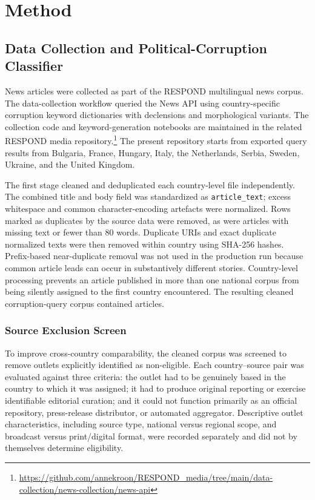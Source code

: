 \section{Method}



\subsection{Data Collection and Political-Corruption Classifier}
\label{sec:method-political-classifier}

News articles were collected as part of the RESPOND multilingual news corpus.
The data-collection workflow queried the News API using country-specific
corruption keyword dictionaries with declensions and morphological variants.
The collection code and keyword-generation notebooks are maintained in the
related RESPOND media repository.\footnote{\url{https://github.com/annekroon/RESPOND_media/tree/main/data-collection/news-collection/news-api}}
The present repository starts from \PCRawQueryN{} exported query results from
Bulgaria, France, Hungary, Italy, the Netherlands, Serbia, Sweden, Ukraine, and
the United Kingdom.

The first stage cleaned and deduplicated each country-level file independently. The combined
title and body field was standardized as \texttt{article\_text}; excess
whitespace and common character-encoding artefacts were normalized. Rows marked
as duplicates by the source data were removed, as were articles with missing
text or fewer than 80 words. Duplicate URIs and exact duplicate normalized texts were then
removed within country using SHA-256 hashes. Prefix-based near-duplicate removal
was not used in the production run because common article leads can occur in
substantively different stories. Country-level processing prevents an article
published in more than one national corpus from being silently assigned to the
first country encountered. The resulting cleaned corruption-query corpus
contained \PCCleanedQueryN{} articles.

\subsubsection{Source Exclusion Screen}

To improve cross-country comparability, the cleaned corpus was screened to
remove outlets explicitly identified as non-eligible. Each country--source pair was evaluated
against three criteria: the outlet had to be genuinely based in the country to
which it was assigned; it had to produce original reporting or exercise
identifiable editorial curation; and it could not function primarily as an
official repository, press-release distributor, or automated aggregator.
Descriptive outlet characteristics, including source type, national versus
regional scope, and broadcast versus print/digital format, were recorded
separately and did not by themselves determine eligibility.


